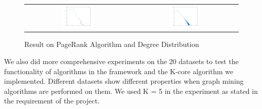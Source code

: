 \begin{figure}[H]
\begin{center}
\begin{tabular}{cc}
     \includegraphics[width=0.3\textwidth]{FIG/10pagerank.png} &
     \includegraphics[width=0.3\textwidth]{FIG/10degreedist.png} \\
\end{tabular}
\caption{Result on PageRank Algorithm and Degree Distribution}
\end{center}
\end{figure}

We also did more comprehensive experiments on the 20 datasets to test the functionality of algorithms in the framework and the K-core algorithm we implemented.
Different datasets show different properties when graph mining algorithms are performed on them. We used K = 5 in the experiment as stated in the requirement of the project.

